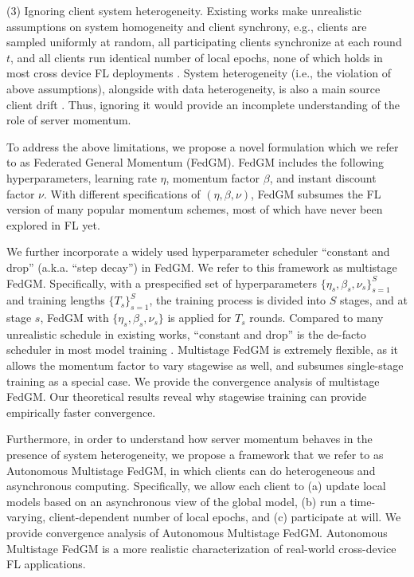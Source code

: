 (3) Ignoring client system heterogeneity. Existing works make unrealistic assumptions on system homogeneity and client synchrony, e.g., clients are sampled uniformly at random, all participating clients synchronize at each round $t$, and all clients run identical number of local epochs, none of which holds in most cross device FL deployments \citep{Kairouz21AdvancesProblems}. System heterogeneity (i.e., the violation of above assumptions), alongside with data heterogeneity, is also a main source client drift \citep{karimireddy2020scaffold}. Thus, ignoring it would provide an incomplete understanding of the role of server momentum. 

To address the above limitations, we propose a novel formulation which we refer to as Federated General Momentum (FedGM). FedGM includes the following hyperparameters, learning rate $\eta$, momentum factor $\beta$, and instant discount factor $\nu$. With different specifications of $(\eta,\beta,\nu)$, FedGM subsumes the FL version of many popular momentum schemes, most of which have never been explored in FL yet. 

We further incorporate a widely used hyperparameter scheduler ``constant and drop'' (a.k.a. ``step decay'') in FedGM. We refer to this framework as multistage FedGM. Specifically, with a prespecified set of hyperparameters $\{\eta_s,\beta_s,\nu_s\}_{s=1}^{S}$ and training lengths $\{T_s\}_{s=1}^{S}$, the training process is divided into $S$ stages, and at stage $s$, FedGM with $\{\eta_s,\beta_s,\nu_s\}$ is applied for $T_s$ rounds. Compared to many unrealistic schedule in existing works, ``constant and drop'' is the de-facto scheduler in most model training \citep{Sutskever13Init,He16Res,Huang2017DenseNet}. Multistage FedGM is extremely flexible, as it allows the momentum factor to vary stagewise as well, and subsumes single-stage training as a special case. We provide the convergence analysis of multistage FedGM. Our theoretical results reveal why stagewise training can provide empirically faster convergence. 

Furthermore, in order to understand how server momentum behaves in the presence of system heterogeneity, we propose a framework that we refer to as Autonomous Multistage FedGM, in which clients can do heterogeneous and asynchronous computing. Specifically, we allow each client to (a) update local models based on an asynchronous view of the global model, (b) run a time-varying, client-dependent number of local epochs, and (c) participate at will. We provide convergence analysis of Autonomous Multistage FedGM. Autonomous Multistage FedGM is a more realistic characterization of real-world cross-device FL applications.

